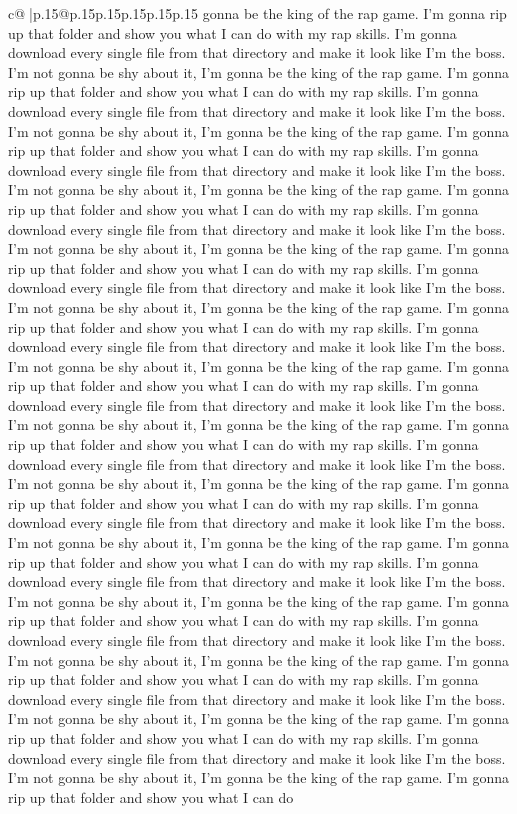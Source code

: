 \documentclass{article}
\begin{document}
{\begin{supertabular}{c@{$\;$}|p{.15\linewidth}@{}p{.15\linewidth}p{.15\linewidth}p{.15\linewidth}p{.15\linewidth}p{.15\linewidth}}
{{{gonna be the king of the rap game. I'm gonna rip up that folder and show you what I can do with my rap skills. I'm gonna download every single file from that directory and make it look like I'm the boss. I'm not gonna be shy about it, I'm gonna be the king of the rap game. I'm gonna rip up that folder and show you what I can do with my rap skills. I'm gonna download every single file from that directory and make it look like I'm the boss. I'm not gonna be shy about it, I'm gonna be the king of the rap game. I'm gonna rip up that folder and show you what I can do with my rap skills. I'm gonna download every single file from that directory and make it look like I'm the boss. I'm not gonna be shy about it, I'm gonna be the king of the rap game. I'm gonna rip up that folder and show you what I can do with my rap skills. I'm gonna download every single file from that directory and make it look like I'm the boss. I'm not gonna be shy about it, I'm gonna be the king of the rap game. I'm gonna rip up that folder and show you what I can do with my rap skills. I'm gonna download every single file from that directory and make it look like I'm the boss. I'm not gonna be shy about it, I'm gonna be the king of the rap game. I'm gonna rip up that folder and show you what I can do with my rap skills. I'm gonna download every single file from that directory and make it look like I'm the boss. I'm not gonna be shy about it, I'm gonna be the king of the rap game. I'm gonna rip up that folder and show you what I can do with my rap skills. I'm gonna download every single file from that directory and make it look like I'm the boss. I'm not gonna be shy about it, I'm gonna be the king of the rap game. I'm gonna rip up that folder and show you what I can do with my rap skills. I'm gonna download every single file from that directory and make it look like I'm the boss. I'm not gonna be shy about it, I'm gonna be the king of the rap game. I'm gonna rip up that folder and show you what I can do with my rap skills. I'm gonna download every single file from that directory and make it look like I'm the boss. I'm not gonna be shy about it, I'm gonna be the king of the rap game. I'm gonna rip up that folder and show you what I can do with my rap skills. I'm gonna download every single file from that directory and make it look like I'm the boss. I'm not gonna be shy about it, I'm gonna be the king of the rap game. I'm gonna rip up that folder and show you what I can do with my rap skills. I'm gonna download every single file from that directory and make it look like I'm the boss. I'm not gonna be shy about it, I'm gonna be the king of the rap game. I'm gonna rip up that folder and show you what I can do with my rap skills. I'm gonna download every single file from that directory and make it look like I'm the boss. I'm not gonna be shy about it, I'm gonna be the king of the rap game. I'm gonna rip up that folder and show you what I can do with my rap skills. I'm gonna download every single file from that directory and make it look like I'm the boss. I'm not gonna be shy about it, I'm gonna be the king of the rap game. I'm gonna rip up that folder and show you what I can do }}}
\end{supertabular}}
\end{document}
